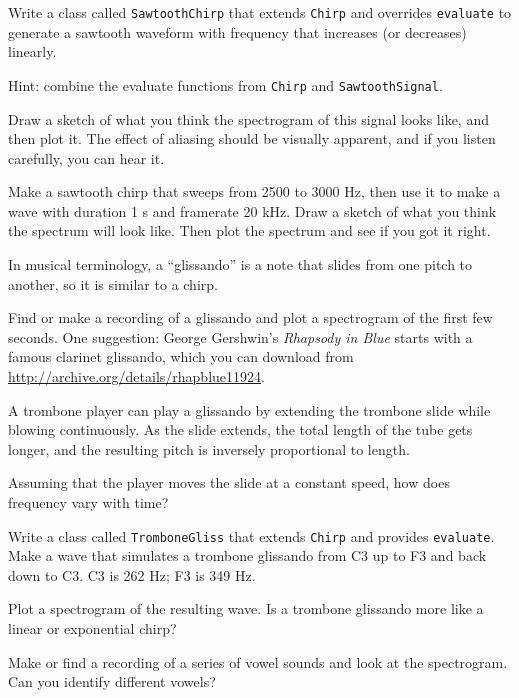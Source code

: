 \documentclass[12pt]{book}
\begin{document}
\begin{exercise}
Write a class called {\tt SawtoothChirp} that extends {\tt Chirp}
and overrides {\tt evaluate} to generate a sawtooth waveform with
frequency that increases (or decreases) linearly.

Hint: combine the evaluate functions from {\tt Chirp} and
{\tt SawtoothSignal}.

Draw a sketch of what you think the spectrogram of this signal
looks like, and then plot it.  The effect of aliasing should be
visually apparent, and if you listen carefully, you can hear it.
\end{exercise}


\begin{exercise}
Make a sawtooth chirp that sweeps from 2500 to 3000 Hz, then use it to
make a wave with duration 1 s and framerate 20 kHz.  Draw a sketch of
what you think the spectrum will look like.  Then plot the
spectrum and see if you got it right.
\end{exercise}


\begin{exercise}
In musical terminology, a ``glissando'' is a note that slides from one
pitch to another, so it is similar to a chirp.

Find or make a recording of a glissando and plot a spectrogram of the
first few seconds.  One suggestion: George Gershwin's {\it Rhapsody in
  Blue} starts with a famous clarinet glissando, which you can download
from \url{http://archive.org/details/rhapblue11924}.
\end{exercise}


\begin{exercise}
A trombone player can play a glissando by extending the trombone
slide while blowing continuously.  As the slide extends, the total
length of the tube gets longer, and the resulting pitch is inversely
proportional to length.

Assuming that the player moves the slide at a constant speed, how
does frequency vary with time?  

Write a class called {\tt TromboneGliss} that extends {\tt Chirp} and
provides {\tt evaluate}.  Make a wave that simulates a trombone
glissando from C3 up to F3 and back down to C3.  C3 is 262 Hz; F3 is
349 Hz.

Plot a spectrogram of the resulting wave.  Is a trombone glissando
more like a linear or exponential chirp?
\end{exercise}


\begin{exercise}
Make or find a recording of a series of vowel sounds and look at the
spectrogram.  Can you identify different vowels?
\end{exercise}
\end{document}
